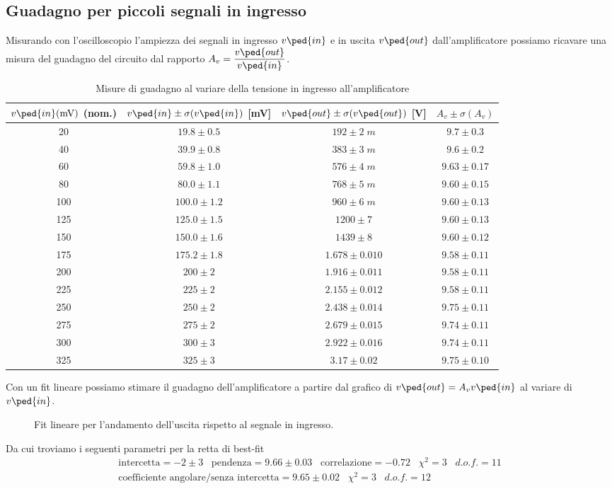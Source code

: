 \documentclass[10pt,a4paper]{article}
\begin{document}
\subsection{Guadagno per piccoli segnali in ingresso}
Misurando con l'oscilloscopio l'ampiezza dei segnali in ingresso $v\ped{in}$
e in uscita $v\ped{out}$ dall'amplificatore possiamo ricavare una misura del
guadagno del circuito dal rapporto $A_v = \dfrac{v\ped{out}}{v\ped{in}}$.
\begin{table}[htb]
\centering
\begin{tabular}{cccc}
\toprule
$v\ped{in}(\si{m\V})$ (nom.) & $v\ped{in} \pm \sigma(v\ped{in})$ [mV] & $v\ped{out} \pm \sigma(v\ped{out})$ [V] & $A_v \pm \sigma(A_v)$ \\
\midrule
\midrule
20 & $19.8 \pm 0.5$ & $192 \pm 2 \; \si{m}$ & $9.7 \pm 0.3$ \\
40 & $39.9 \pm 0.8$ & $383 \pm 3 \; \si{m}$ & $9.6 \pm 0.2$ \\
60 & $59.8 \pm 1.0$ & $576 \pm 4 \; \si{m}$ & $9.63 \pm 0.17$ \\
80 & $80.0 \pm 1.1$ & $768 \pm 5 \; \si{m}$ & $9.60 \pm 0.15$ \\
100 & $100.0 \pm 1.2$ & $960 \pm 6 \; \si{m}$ & $9.60 \pm 0.13$ \\
125 & $125.0 \pm 1.5$ & $1200 \pm 7$ & $9.60 \pm 0.13$ \\
150 & $150.0 \pm 1.6$ & $1439 \pm 8$ & $9.60 \pm 0.12$ \\
175 & $175.2 \pm 1.8$ & $1.678 \pm 0.010$ & $9.58 \pm 0.11$ \\
200 & $200 \pm 2$ & $1.916 \pm 0.011$ & $9.58 \pm 0.11$ \\
225 & $225 \pm 2$ & $2.155 \pm 0.012$ & $9.58 \pm 0.11$ \\
250 & $250 \pm 2$ & $2.438 \pm 0.014$ & $9.75 \pm 0.11$ \\
275 & $275 \pm 2$ & $2.679 \pm 0.015$ & $9.74 \pm 0.11$ \\
300 & $300 \pm 3$ & $2.922 \pm 0.016$ & $9.74 \pm 0.11$ \\
325 & $325 \pm 3$ & $3.17 \pm 0.02$ & $9.75\pm 0.10$ \\
\bottomrule
\end{tabular} 
\caption{Misure di guadagno al variare della tensione in ingresso
all'amplificatore \label{tab: bjtmes}}
\end{table}

Con un fit lineare possiamo stimare il guadagno dell'amplificatore a partire
dal grafico di $v\ped{out} = A_v v\ped{in}$ al variare di $v\ped{in}$.
\begin{figure}[htb]
\centering
\caption{Fit lineare per l'andamento dell'uscita rispetto al segnale in
ingresso. \label{fig: gainfit}}
\end{figure}
Da cui troviamo i seguenti parametri per la retta di best-fit
\begin{align*}
\mathrm{intercetta} = -2 \pm 3 \;\;\;\mathrm{pendenza} = 9.66 \pm 0.03 \;\;\;\mathrm{correlazione} 
= -0.72 \;\;\; \chi^2 = 3 \;\;\; d.o.f. = 11 \\
\text{coefficiente angolare/senza intercetta} = 9.65 \pm 0.02 \;\;\;
\chi^2 = 3 \;\;\; d.o.f. = 12
\end{align*}
\end{document}
